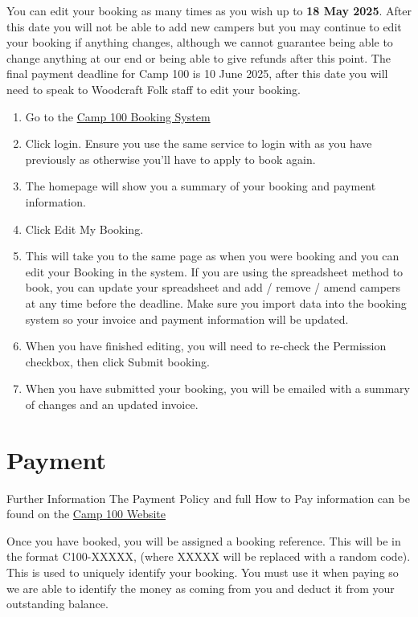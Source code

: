 \documentclass[a4paper, 11pt]{report}
\begin{document}
You can edit your booking as many times as you wish up to \textbf{18 May 2025}. After this date you will not be able to add new campers but you may continue to edit your booking if anything changes, although we cannot guarantee being able to change anything at our end or being able to give refunds after this point. The final payment deadline for Camp 100 is 10 June 2025, after this date you will need to speak to Woodcraft Folk staff to edit your booking. 
\begin{enumerate}
    \item Go to the \href{https://bookings.camp100.org.ukj}{Camp 100 Booking System}
    \item Click login. Ensure you use the same service to login with as you have previously as otherwise you'll have to apply to book again.
    \item The homepage will show you a summary of your booking and payment information.
    \item Click Edit My Booking.
    \item This will take you to the same page as when you were booking and you can edit your Booking in the system. If you are using the spreadsheet method to book, you can update your spreadsheet and add / remove / amend campers at any time before the deadline. Make sure you import data into the booking system so your invoice and payment information will be updated.
    \item When you have finished editing, you will need to re-check the Permission checkbox, then click Submit booking.
    \item When you have submitted your booking, you will be emailed with a summary of changes and an updated invoice.
\end{enumerate}

\chapter{Payment}
\label{chap:payment}

\begin{callout-orange}{Further Information}
The Payment Policy and full How to Pay information can be found on the \href{https://camp100.org.uk}{Camp 100 Website}
\end{callout-orange}

Once you have booked, you will be assigned a booking reference. This will be in the format C100-XXXXX, (where XXXXX will be replaced with a random code). This is used to uniquely identify your booking. You must use it when paying so we are able to identify the money as coming from you and deduct it from your outstanding balance.
\end{document}

